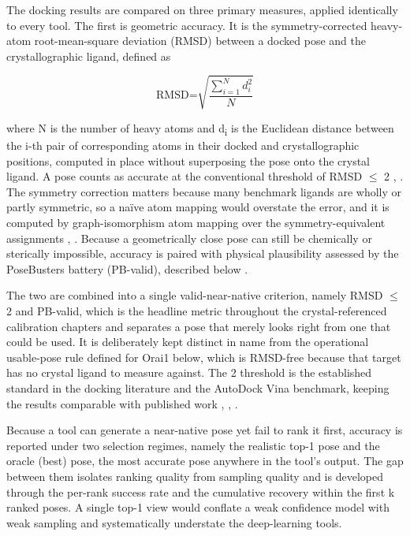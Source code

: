 The docking results are compared on three primary measures, applied identically to every tool. The first is geometric accuracy. It is the symmetry-corrected heavy-atom root-mean-square deviation (RMSD) between a docked pose and the crystallographic ligand, defined as

\[\text{RMSD=}\sqrt{\frac{\sum_{i = 1}^{N}d_{i}^{\text{2}}}{N}}\]

where N is the number of heavy atoms and d\textsubscript{i} is the Euclidean distance between the i-th pair of corresponding atoms in their docked and crystallographic positions, computed in place without superposing the pose onto the crystal ligand. A pose counts as accurate at the conventional threshold of RMSD \ensuremath{\leq} 2\angstrom{} \cite{ref022}, \cite{ref050}. The symmetry correction matters because many benchmark ligands are wholly or partly symmetric, so a naïve atom mapping would overstate the error, and it is computed by graph-isomorphism atom mapping over the symmetry-equivalent assignments \cite{ref044}, \cite{ref048}. Because a geometrically close pose can still be chemically or sterically impossible, accuracy is paired with physical plausibility assessed by the PoseBusters battery (PB-valid), described below \cite{ref035}.

The two are combined into a single valid-near-native criterion, namely RMSD \ensuremath{\leq} 2\angstrom{} and PB-valid, which is the headline metric throughout the crystal-referenced calibration chapters and separates a pose that merely looks right from one that could be used. It is deliberately kept distinct in name from the operational usable-pose rule defined for Orai1 below, which is RMSD-free because that target has no crystal ligand to measure against. The 2\angstrom{} threshold is the established standard in the docking literature and the AutoDock Vina benchmark, keeping the results comparable with published work \cite{ref022}, \cite{ref035}, \cite{ref050}.

Because a tool can generate a near-native pose yet fail to rank it first, accuracy is reported under two selection regimes, namely the realistic top-1 pose and the oracle (best) pose, the most accurate pose anywhere in the tool's output. The gap between them isolates ranking quality from sampling quality and is developed through the per-rank success rate and the cumulative recovery within the first k ranked poses. A single top-1 view would conflate a weak confidence model with weak sampling and systematically understate the deep-learning tools.

